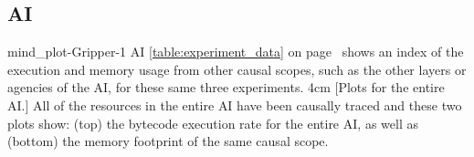 \newcommand{\experimentdatacommontablereference}{%
  {\mbox{\autoref{table:experiment_data}}} on
  {\mbox{page~\pageref{table:experiment_data}}} shows an index of
  the execution and memory usage from other causal scopes, such as
  the other layers or agencies of the AI, for these same three
  experiments.
}

\newcommand{\experimentdatacaptionbegin}[1]{
  \def\experimentdatacausegroupprettyname{#1}%
  All of the resources in the entire
  {\experimentdatacausegroupprettyname} have been causally traced and
  these two plots show: (top) the bytecode execution rate for the
  entire {\experimentdatacausegroupprettyname}, as well as (bottom)
  the memory footprint of the same causal scope.}

{\newpage
  \noindent\begin{minipage}{\textwidth}
    \subsection{AI}
    \experimentcausegroupplots{\dataappendixmaxtime}
                              {\dataappendixexperimentonemaxtime}
                              {\dataappendixexperimenttwomaxtime}
                              {\dataappendixexperimentthreemaxtime}
                              {\dataappendixexperimentonename}
                              {\dataappendixexperimenttwoname}
                              {\dataappendixexperimentthreename}
                              {\dataappendixexperimentoneprettyname}
                              {\dataappendixexperimenttwoprettyname}
                              \experimentcausegroupplotscontinued{\dataappendixexperimentthreeprettyname}
                                                                 {mind_plot-Gripper-1}
                                                                 {AI}
                                                                 {\experimentdatacommontablereference}
                                                                 {4cm}
    \experimentdatablocksworldexample
    [Plots for the entire
      AI.]{\experimentdatacaptionbegin{AI}}
  \label{figure:mind_plot-Gripper-1}
  \end{minipage}
}
